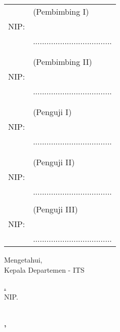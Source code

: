 \noindent
\begin{tabularx}{\textwidth}{X l}
  \advisor{}               & (Pembimbing I)                      \\
  NIP: \advisornip{}       &                                     \\
                           & ................................... \\
                           &                                     \\
                           &                                     \\
  \coadvisor{}             & (Pembimbing II)                     \\
  NIP: \coadvisornip{}     &                                     \\
                           & ................................... \\
                           &                                     \\
                           &                                     \\
  \examinerone{}           & (Penguji I)                         \\
  NIP:  \examineronenip{}  &                                     \\
                           & ................................... \\
                           &                                     \\
                           &                                     \\
  \examinertwo{}           & (Penguji II)                        \\
  NIP:  \examinertwonip{}  &                                     \\
                           & ................................... \\
                           &                                     \\
  \examinerthree{}         & (Penguji III)                       \\
  NIP:  \examinerthreenip{}&                                     \\
                           & ................................... \\                    
\end{tabularx}
\endgroup

\begin{center}
  Mengetahui, \\
  Kepala Departemen \department{} \facultyshort{} - ITS\\

  \vspace{8ex}

  \underline{\headofdepartment{}.} \\
  NIP. \headofdepartmentnip{}
\end{center}

\begin{center}
  \textbf{\MakeUppercase{\place{}}\\\MONTH{}, \the\year{}}
\end{center}
\endgroup
